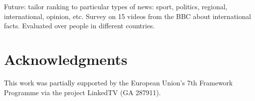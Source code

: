 \documentclass{llncs}
\begin{document}
Future: tailor ranking to particular types of news: sport, politics, regional, international, opinion, etc. Survey on 15 videos from the BBC about international facts. Evaluated over people in different countries.


\section*{Acknowledgments}
This work was partially supported by the European Union's 7th Framework Programme via the project LinkedTV (GA 287911).



\end{document}
